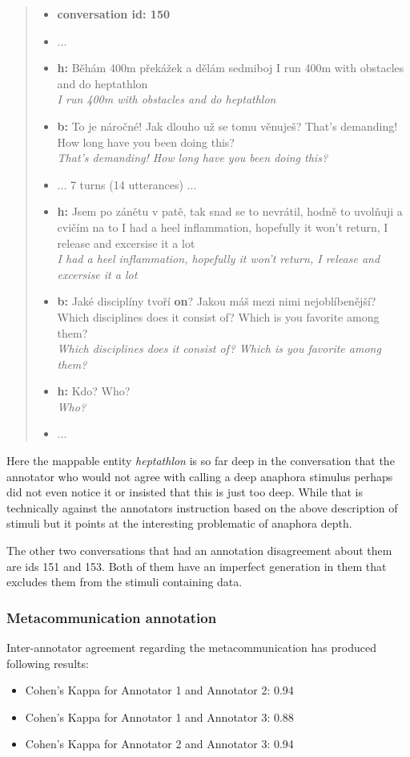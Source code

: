\documentclass[12pt]{report}
\newcommand{\utterance}[3]{%
    \textbf{#1} #2%
    \ifx\relax#3\relax%
    \else \\ \textit{#3}%
    \fi%
}
\begin{document}
{\begin{quote}
\begin{itemize}[label={}, leftmargin=0pt, itemsep=0.5em]
\item \textbf{conversation id: 150}
\item ...
\item \utterance{h:}{Běhám 400m překážek a dělám sedmiboj}{I run 400m with obstacles and do heptathlon}
\item \utterance{b:}{To je náročné! Jak dlouho už se tomu věnuješ?}{That's demanding! How long have you been doing this?}
\item ... 7 turns (14 utterances) ...
\item \utterance{h:}{Jsem po zánětu v patě, tak snad se to nevrátil, hodně to uvolňuji a cvičím na to}{I had a heel inflammation, hopefully it won't return, I release and excersise it a lot}
\item \utterance{b:}{Jaké disciplíny tvoří \textbf{on}? Jakou máš mezi nimi nejoblíbenější?}{Which disciplines does it consist of? Which is you favorite among them?}
\item \utterance{h:}{Kdo?}{Who?}
\item ...
\end{itemize}
\end{quote}

Here the mappable entity \textit{heptathlon} is so far deep in the conversation that
the annotator who would not agree with calling a deep anaphora stimulus
perhaps did not even notice it or insisted that this is just too deep.
While that is technically against the annotators instruction based on the above description of stimuli
but it points at the interesting problematic of anaphora depth.

The other two conversations that had an annotation disagreement about them are ids 151 and 153.
Both of them have an imperfect generation in them that excludes them from the stimuli containing data.

\subsubsection{Metacommunication annotation}

Inter-annotator agreement regarding the metacommunication has produced following results:

\begin{itemize}[label={}]
\item Cohen's Kappa for Annotator 1 and Annotator 2: 0.94
\item Cohen's Kappa for Annotator 1 and Annotator 3: 0.88
\item Cohen's Kappa for Annotator 2 and Annotator 3: 0.94
\end{itemize}

}
\end{document}
